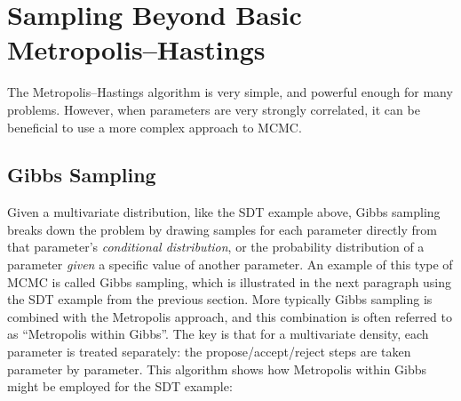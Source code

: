 \section{Sampling Beyond Basic Metropolis--Hastings}

The Metropolis--Hastings algorithm is very simple, and powerful enough for many problems. However, when parameters are very strongly correlated, it can be beneficial to use a more complex approach to MCMC.

\subsection{Gibbs Sampling}

Given a multivariate distribution, like the SDT example above, Gibbs sampling \cite{SmithRoberts1993} breaks down the problem by drawing samples for each parameter directly from that parameter's \emph{conditional distribution}, or the probability distribution of a parameter \emph{given} a specific value of another parameter. An example of this type of MCMC is called Gibbs sampling, which is illustrated in the next paragraph using the SDT example from the previous section. More typically Gibbs sampling is combined with the Metropolis approach, and this combination is often referred to as ``Metropolis within Gibbs''. The key is that for a multivariate density, each parameter is treated separately: the propose/accept/reject steps are taken parameter by parameter. This algorithm shows how Metropolis within Gibbs might be employed for the SDT example:

